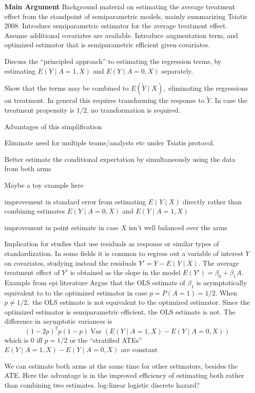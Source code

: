 \documentclass{article}
\newcommand{\EE}{E}
\newcommand{\E}[1]{\EE(Y\mid A=#1,X)}
\DeclareMathOperator{\Var}{Var}
\begin{document}
\begin{outline}[enumerate]
\textbf{Main Argument}
  \1  Background material on estimating the average treatment effect
  from the standpoint of semiparametric models, mainly summarizing
  Tsiatis 2008.
     \2 Introduce semiparametric estimator for the average treatment
  effect. Assume additional covariates are available. Introduce augmentation term, and optimized estimator that is
  semiparametric efficient given covariates.

     \2 Discuss the ``principled approach'' to estimating the regression
  terms, by estimating $E(Y\mid A=1,X)$ and $E(Y\mid A=0,X)$
  separately.

  \1 Show that the terms may be combined to $E(\tilde{Y}\mid X),$ eliminating the regressions on
  treatment. In general this requires transforming the response to
  $\tilde{Y}.$ In case the treatment propensity is $1/2$, no transformation is required.

  \1 Advantages of this simplification

     \2 Eliminate need for multiple teams/analysts etc under Tsiatis protocol.

     \2 Better estimate the conditional expectation by
     simultaneously using the data from both arms

        \3 Maybe a toy example here

           \4 improvement in standard error from estimating $E(Y\mid
           X)$ directly rather than combining estimates $\E0$ and $\E1$

           \4 improvement in point estimate in case $X$ isn't well
           balanced over the arms

  \1 Implication for studies that use residuals as response or similar
  types of standardization. In some
  fields it is common to regress out a variable of interest $Y$ on
  covariates, studying instead the residuals $Y'=Y - E(Y\mid X).$ The
  average treatment effect of $Y'$ is obtained as the slope in the
  model $E(Y') = \beta_0 + \beta_1A.$
     \2 Example from epi literature
     \2 Argue that the OLS estimate of $\beta_1$ is asymptotically equivalent to
     to the optimized estimator in case $p=P(A=1)=1/2.$
     \2 When $p\neq 1/2,$ the OLS estimate is not equivalent to the
     optimized estimator. Since the optimized estimator is
     semiparametric efficient, the OLS estimate is not.
        \3 The difference in asymptotic variances is
     \[(1-2p)^2p(1-p)\Var(\E1-\E0)\]
        which is 0 iff $p=1/2$ or the ``stratified ATEs'' $\E1-\E0$
        are constant

   \1 We can estimate both arms at the
   same time for other estimators, besides the ATE. Here the advantage is in the improved efficiency of
   estimating both rather than combining two estimates.
      \2 log-linear
      \2 logistic
      \2 discrete hazard?\\
    \end{outline}
\end{document}
